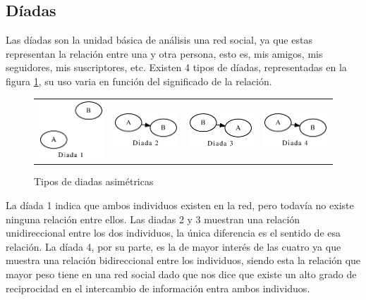\subsection{Díadas}

Las díadas son la unidad básica de análisis una red social, ya que estas representan la relación entre una y otra persona, esto es, mis amigos, mis seguidores, mis suscriptores, etc. Existen 4 tipos de díadas, representadas en la figura \ref{fig:tipos_diadas}, su uso varia en función del significado de la relación.

\begin{figure}[!htb]
  \begin{center}
      \begin{tabular}{m{3cm}|m{3cm}|m{3cm}|m{3cm}}
        \includegraphics[width=3cm]{./imagenes/diada_1.eps} & 
        \includegraphics[width=3cm]{./imagenes/diada_2.eps} & 
        \includegraphics[width=3cm]{./imagenes/diada_3.eps} & 
        \includegraphics[width=3cm]{./imagenes/diada_4.eps}\\
      \end{tabular}
    \caption{Tipos de diadas asimétricas}
    \label{fig:tipos_diadas}
  \end{center}
\end{figure}

La díada 1 indica que ambos individuos existen en la red, pero todavía no existe ninguna relación entre ellos. Las diadas 2 y 3 muestran una relación unidireccional entre los dos individuos, la única diferencia es el sentido de esa relación. La díada 4, por su parte, es la de mayor interés de las cuatro ya que muestra una relación bidireccional entre los individuos, siendo esta la relación que mayor peso tiene en una red social dado que nos dice que existe un alto grado de reciprocidad en el intercambio de información entra ambos individuos.

